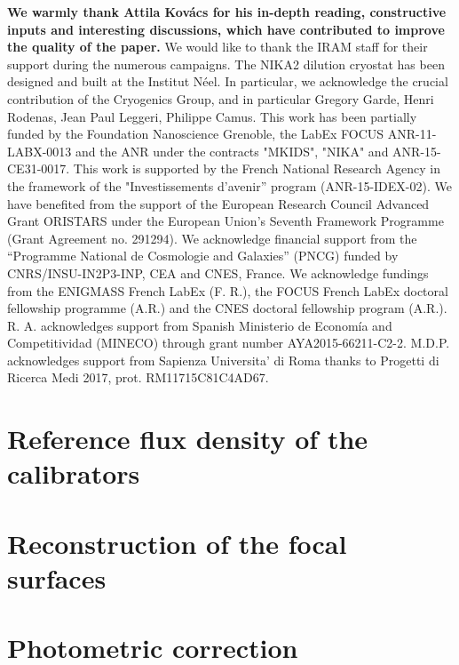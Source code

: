 \documentclass[traditionalabstract]{aa}
\newcommand{\rev}[1]{\bf \color[RGB]{0, 153, 255} #1}
\begin{document}
\begin{acknowledgements}
  {\rev We warmly thank Attila Kov\'acs for his in-depth reading,
    constructive inputs and interesting discussions, which have
    contributed to improve the quality of the paper.}
  We would like to thank the IRAM staff for their support during the
  numerous campaigns. 
  The NIKA2 dilution cryostat has been designed and built at the Institut N\'eel. 
  In particular, we acknowledge the crucial contribution of the Cryogenics Group, and 
  in particular Gregory Garde, Henri Rodenas, Jean Paul Leggeri, Philippe Camus. 
  This work has been partially funded by the Foundation Nanoscience
  Grenoble, the LabEx FOCUS ANR-11-LABX-0013 and the ANR under the
  contracts "MKIDS", "NIKA" and ANR-15-CE31-0017. This work is
  supported by the French National Research Agency in the framework of
  the "Investissements d’avenir” program (ANR-15-IDEX-02).
  We have benefited from the support of the European Research Council Advanced
  Grant ORISTARS under the European Union's Seventh Framework
  Programme (Grant Agreement no. 291294). We acknowledge financial
  support from the “Programme National de Cosmologie and Galaxies”
  (PNCG) funded by CNRS/INSU-IN2P3-INP, CEA and CNES, France.
  We acknowledge fundings from the ENIGMASS French LabEx (F. R.), the FOCUS French
  LabEx doctoral fellowship programme (A.R.) and the CNES doctoral
  fellowship program (A.R.). R. A. acknowledges support from
  Spanish Ministerio de Econom\'ia and Competitividad (MINECO) through
  grant number AYA2015-66211-C2-2. M.D.P. acknowledges support from
  Sapienza Universita' di Roma thanks to Progetti di Ricerca Medi 2017,
  prot. RM11715C81C4AD67. 
\end{acknowledgements}

%
%

\begin{appendix}
  \section{Reference flux density of the calibrators}
  \label{ap:ref_flux_calibrator}
  
  
  \section{Reconstruction of the focal surfaces}
  \label{ap:focus_surfaces}
  

  \section{Photometric correction}
  \label{se:photometric_correction}
  
\end{appendix}

%
\end{document}
